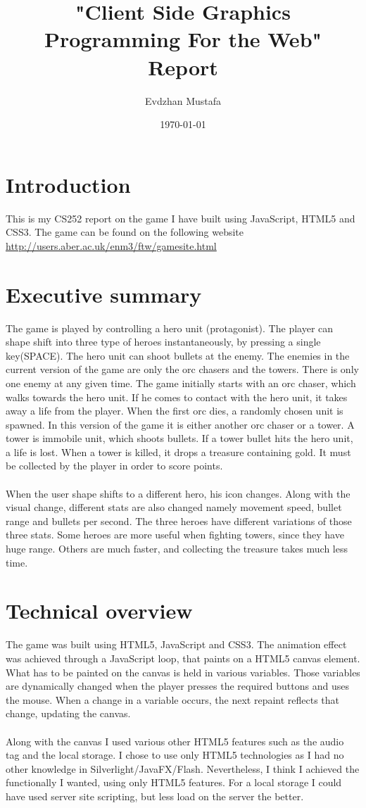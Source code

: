 \documentclass[a4paper]{article}
\title{ "Client Side Graphics Programming For the Web" Report   }
\author{Evdzhan Mustafa}
\date{\today}
\begin{document}
\maketitle

\section{Introduction}
This is my CS252 report on the game I have built using JavaScript, HTML5 and CSS3. The game can be found on the following website \url{http://users.aber.ac.uk/enm3/ftw/gamesite.html}

\section{Executive summary}
The game is played by controlling a hero unit (protagonist). The player can shape shift into three type of heroes instantaneously, by pressing a single key(SPACE).  The hero unit can shoot bullets at the enemy. The enemies in the current version of the game are only the orc chasers and the towers. There is only one enemy at any given time. The game initially starts with an orc chaser, which walks towards the hero unit. If he comes to contact with the hero unit, it takes away a life from the player. When the first orc dies, a randomly chosen unit is spawned. In this version of the game it is either another orc chaser or a tower. A tower is immobile unit, which shoots bullets. If a tower bullet hits the hero unit, a life is lost. When a tower is killed, it drops a treasure containing gold. It must be collected by the player in order to score points.\\ \\
When the user shape shifts to a different hero, his icon changes. Along with the visual change, different stats are also changed namely movement speed, bullet range and bullets per second. The three heroes have different variations of those three stats. Some heroes are more useful when fighting towers, since they have huge range. Others are much faster, and collecting the treasure takes much less time.

\section{Technical overview}
The game was built using HTML5, JavaScript and CSS3. The animation effect was achieved through a JavaScript loop, that paints on a HTML5 canvas element. What has to be painted on the canvas is held in various variables. Those variables are dynamically changed when the player presses the required buttons and uses the mouse. When a change in a variable occurs, the next repaint reflects that change, updating the canvas. \\\\
Along with the canvas I used various other HTML5 features such as the audio tag and the local storage. I chose to use only HTML5 technologies as I had no other knowledge in Silverlight/JavaFX/Flash. Nevertheless, I think I achieved the functionally I wanted, using only HTML5 features. For a local storage I could have used server site scripting, but less load on the server the better.
\end{document}

